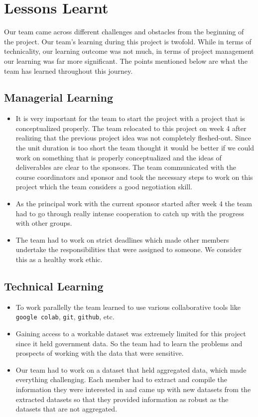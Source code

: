 \section{Lessons Learnt}
Our team came across different challenges and obstacles from the beginning of the project. Our team's learning during this project is twofold.  While in terms of technicality, our learning outcome was not much, in terms of project management our learning was far more significant. The points mentioned below are what the team has learned throughout this journey.
\subsection{Managerial Learning}
\begin{itemize}
    \item It is very important for the team to start the project with a project that is conceptualized properly. The team relocated to this project on week 4 after realizing that the previous project idea was not completely fleshed-out. Since the unit duration is too short the team thought it would be better if we could work on something that is properly conceptualized and the ideas of deliverables are clear to the sponsors. The team communicated with the course coordinators and sponsor and took the necessary steps to work on this project which the team considers a good negotiation skill.
    \item As the principal work with the current sponsor started after week 4 the team had to go through really intense cooperation to catch up with the progress with other groups.
    \item The team had to work on strict deadlines which made other members undertake the responsibilities that were assigned to someone. We consider this as a healthy work ethic.
\end{itemize}
\subsection{Technical Learning}
\begin{itemize}
    \item To work parallelly the team learned to use various collaborative tools like \verb|google colab|, \verb|git|, \verb|github|, etc. 
    \item Gaining access to a workable dataset was extremely limited for this project since it held government data. So the team had to learn the problems and prospects of working with the data that were sensitive.
    \item Our team had to work on a dataset that held aggregated data, which made everything challenging. Each member had to extract and compile the information they were interested in and came up with new datasets from the extracted datasets so that they provided information as robust as the datasets that are not aggregated.
\end{itemize}
